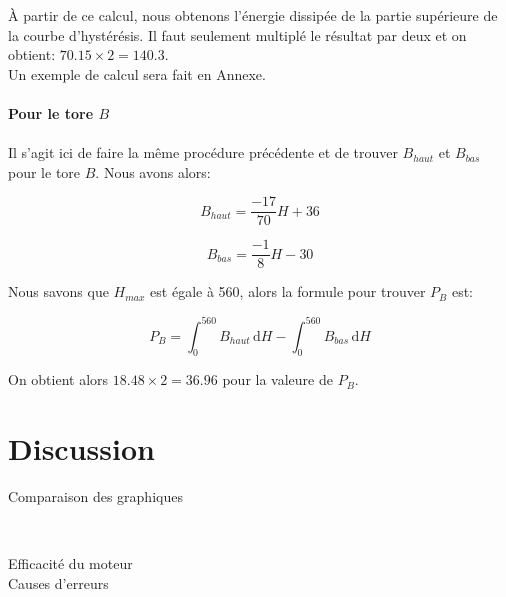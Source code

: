 \documentclass{article}
\begin{document}
\begin{description}
À partir de ce calcul, nous obtenons l'énergie dissipée de la partie supérieure de la courbe d'hystérésis. Il faut seulement multiplé le résultat par deux et on obtient: $70.15\times 2 = 140.3$.\\
Un exemple de calcul sera fait en Annexe.\\
\\
\textbf{Pour le tore $B$}\\
\\
Il s'agit ici de faire la même procédure précédente et de trouver $B_{haut}$ et $B_{bas}$ pour le tore $B$. Nous avons alors:

\begin{equation}
B_{haut} = \frac{-17}{70}H + 36
\end{equation}

\begin{equation}
B_{bas} = \frac{-1}{8}H - 30
\end{equation}

Nous savons que $H_{max}$ est égale à 560, alors la formule pour trouver $P_B$ est:

\begin{equation}
P_B = \int_0^{560}\! B_{haut}\,\mathrm{d}H - \int_0^{560}\! B_{bas}\,\mathrm{d}H
\end{equation}

On obtient alors $18.48\times 2 = 36.96$ pour la valeure de $P_B$.

\pagebreak

\end{description}

%

\section{Discussion}

\begin{description}
\item[Comparaison des graphiques] \hfill\\



\item[Efficacité du moteur] \hfill


\item[Causes d'erreurs] \hfill\\


\end{description}
\end{document}
